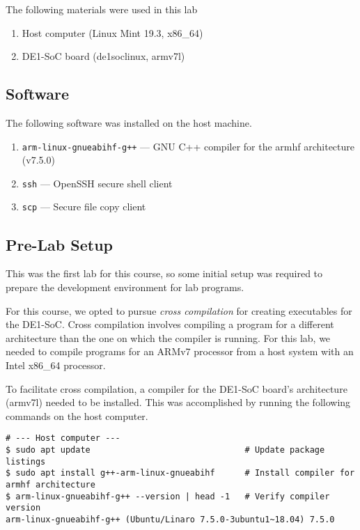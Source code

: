 \documentclass[11pt, letterpaper]{article} %
\begin{document}
The following materials were used in this lab
\begin{enumerate}
    \item Host computer (Linux Mint 19.3, x86\_64) %
    \item DE1-SoC board (de1soclinux, armv7l) %
\end{enumerate}

\subsection*{Software}
The following software was installed on the host machine.
\begin{enumerate}
    \item \texttt{arm-linux-gnueabihf-g++} --- GNU C++ compiler for the armhf architecture (v7.5.0)
    \item \texttt{ssh} --- OpenSSH secure shell client
    \item \texttt{scp} --- Secure file copy client
\end{enumerate}

\subsection*{Pre-Lab Setup}

This was the first lab for this course, so some initial setup was required to prepare the development environment for lab programs.

For this course, we opted to pursue \emph{cross compilation} for creating executables for the DE1-SoC. Cross compilation involves compiling a program for a different architecture than the one on which the compiler is running. For this lab, we needed to compile programs for an ARMv7 processor	from a host system with an Intel x86\_64 processor.

%
%

To facilitate cross compilation, a compiler for the DE1-SoC board's architecture (armv7l) needed to be installed. This was accomplished by running the following commands on the host computer.
\pagebreak[2] %
\begin{lstlisting}[style=labreportstyle-sh]
# --- Host computer --- 
$ sudo apt update                               # Update package listings
$ sudo apt install g++-arm-linux-gnueabihf      # Install compiler for armhf architecture
$ arm-linux-gnueabihf-g++ --version | head -1   # Verify compiler version
arm-linux-gnueabihf-g++ (Ubuntu/Linaro 7.5.0-3ubuntu1~18.04) 7.5.0
\end{lstlisting}
\end{document}
